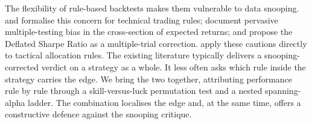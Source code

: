 The flexibility of rule-based backtests makes them vulnerable to data snooping. \citet{sullivan1999} and \citet{white2000} formalise this concern for technical trading rules; \citet{harvey2016} document pervasive multiple-testing bias in the cross-section of expected returns; and \citet{bailey2014} propose the Deflated Sharpe Ratio as a multiple-trial correction. \citet{yang2019} apply these cautions directly to tactical allocation rules. The existing literature typically delivers a snooping-corrected verdict on a strategy as a whole. It less often asks which rule inside the strategy carries the edge. We bring the two together, attributing performance rule by rule through a skill-versus-luck permutation test and a nested spanning-alpha ladder. The combination localises the edge and, at the same time, offers a constructive defence against the snooping critique.

